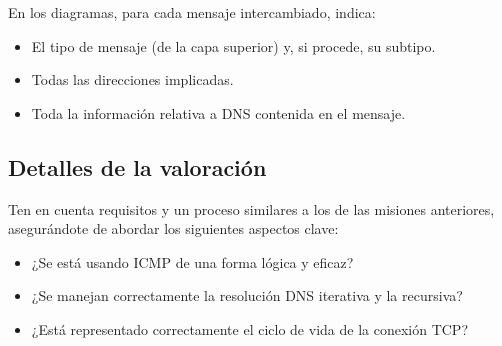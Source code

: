 \begin{enumerate}[itemsep=0.1cm]
En los diagramas, para cada mensaje intercambiado, indica:
    \begin{itemize}
    \item El tipo de mensaje (de la capa superior) y, si procede, su subtipo.
    \item Todas las direcciones implicadas.
    \item Toda la información relativa a DNS contenida en el mensaje.
    \end{itemize}

\end{enumerate}

\subsection*{Detalles de la valoración}

Ten en cuenta requisitos y un proceso similares a los de las misiones anteriores, asegurándote de abordar los siguientes aspectos clave:

\begin{itemize}
\item ¿Se está usando ICMP de una forma lógica y eficaz?
\item ¿Se manejan correctamente la resolución DNS iterativa y la recursiva?
\item ¿Está representado correctamente el ciclo de vida de la conexión TCP?
\end{itemize}


